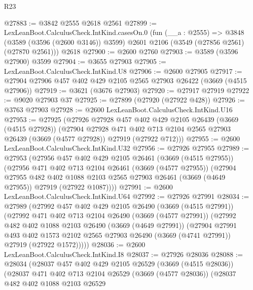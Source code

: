 \begin{lexlean}{R23}
\begin{coremodule}
@27883 := @3842 @2555 @2618 @2561
@27899 := LexLeanBoot.CalculusCheck.IntKind.casesOn.{0}
    (fun (__a : @2555) =>
    @3848 (@3589 (@3596 (@2600 @3146)) @3599) @2601 @2106 (@3549 (@27856 @2561) (@27870 @2561)))
    @2618
@27900 := @2600 @2760
@27903 := @3589 (@3596 @27900) @3599
@27904 := @3655 @27903
@27905 := LexLeanBoot.CalculusCheck.IntKind.U8
@27906 := @2600 @27905
@27917 := @27904 @27906 @457 @402 @429 @2105 @2565 @27903 @26422 (@3669 (@4515 @27906))
@27919 := @3621 (@3676 @27903)
@27920 := @27917 @27919
@27922 := @9020 @27903 @37
@27925 := @27899 (@27920 (@27922 @428))
@27926 := @3763 @27903
@27928 := @2600 LexLeanBoot.CalculusCheck.IntKind.U16
@27953 := @27925
    (@27926
      @27928
      @457
      @402
      @429
      @2105
      @26439
      (@3669 (@4515 @27928))
      (@27904
        @27928
        @471
        @402
        @713
        @2104
        @2565
        @27903
        @26439
        (@3669 (@4577 @27928))
        @27919
        (@27922 @712)))
@27955 := @2600 LexLeanBoot.CalculusCheck.IntKind.U32
@27956 := @27926 @27955
@27989 := @27953
    (@27956
      @457
      @402
      @429
      @2105
      @26461
      (@3669 (@4515 @27955))
      (@27956
        @471
        @402
        @713
        @2104
        @26461
        (@3669 (@4577 @27955))
        (@27904
          @27955
          @482
          @402
          @1088
          @2103
          @2565
          @27903
          @26461
          (@3669 (@4649 @27955))
          @27919
          (@27922 @1087))))
@27991 := @2600 LexLeanBoot.CalculusCheck.IntKind.U64
@27992 := @27926 @27991
@28034 := @27989
    (@27992
      @457
      @402
      @429
      @2105
      @26490
      (@3669 (@4515 @27991))
      (@27992
        @471
        @402
        @713
        @2104
        @26490
        (@3669 (@4577 @27991))
        (@27992
          @482
          @402
          @1088
          @2103
          @26490
          (@3669 (@4649 @27991))
          (@27904
            @27991
            @493
            @402
            @1573
            @2102
            @2565
            @27903
            @26490
            (@3669 (@4741 @27991))
            @27919
            (@27922 @1572)))))
@28036 := @2600 LexLeanBoot.CalculusCheck.IntKind.I8
@28037 := @27926 @28036
@28088 := @28034
    (@28037
      @457
      @402
      @429
      @2105
      @26529
      (@3669 (@4515 @28036))
      (@28037
        @471
        @402
        @713
        @2104
        @26529
        (@3669 (@4577 @28036))
        (@28037
          @482
          @402
          @1088
          @2103
          @26529

\end{coremodule}
\end{lexlean}
